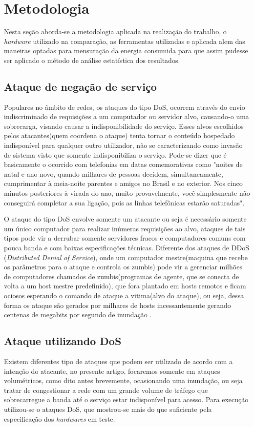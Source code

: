\documentclass[12pt]{article}
\begin{document}
\section{Metodologia} \label{sec:metodologia}
  Nesta seção aborda-se a metodologia aplicada na realização do trabalho, o \textit{hardware} utilizado na comparação, as ferramentas utilizadas e aplicada alem das maneiras optadas para mensuração da energia consumida para que assim pudesse ser aplicado o método de análise estatística dos resultados.


  \subsection{Ataque de negação de serviço} \label{sec:ddos}
    Populares no âmbito de redes, os ataques do tipo DoS, ocorrem através do envio indiscriminado de requisições a um computador ou servidor alvo, causando-o uma sobrecarga, visando causar a indisponibilidade do serviço. Esses alvos escolhidos pelos atacantes(quem coordena o ataque) tenta tornar o conteúdo hospedado indisponível para qualquer outro utilizador, não se caracterizando como invasão de sistema visto que somente indisponibiliza o serviço. Pode-se dizer que é basicamente o ocorrido com telefonias em datas comemorativas como "noites de natal e ano novo, quando milhares de pessoas decidem, simultaneamente, cumprimentar à meia-noite parentes e amigos no Brasil e no exterior. Nos cinco minutos posteriores à virada do ano, muito provavelmente, você simplesmente não conseguirá completar a sua ligação, pois as linhas telefônicas estarão saturadas"\cite{ddOS}.


    O ataque do tipo DoS envolve somente um atacante ou seja é necessário somente um único computador para realizar inúmeras requisições ao alvo, ataques de tais tipos pode vir a derrubar somente servidores fracos e computadores comuns com pouca banda e com baixas especificações técnicas. Diferente dos ataques de DDoS (\textit{Distributed Denial of Service}), onde um computador mestre(maquina que recebe os parâmetros para o ataque e controla os zumbis) pode vir a gerenciar milhões de computadores chamados de zumbis(programas de agente, que se conecta de volta a um host mestre predefinido), que fora plantado em hosts remotos e ficam ociosos esperando o comando de ataque a vitima(alvo do ataque), ou seja, dessa forma os ataque são gerados por milhares de hosts incessantemente gerando centenas de megabits por segundo de inundação \cite{ddOS2}. 
  
  \subsection{Ataque utilizando DoS} \label{sec:ataquedos}
    Existem diferentes tipo de ataques que podem ser utilizado de acordo com a intenção do atacante, no presente artigo, focaremos somente em ataques volumétricos, como dito antes brevemente, ocasionando uma inundação, ou seja tratar de congestionar a rede com um grande volume de tráfego que sobrecarregue a banda até o serviço estar indisponível para acesso. Para execução utilizou-se o ataques DoS, que mostrou-se mais do que suficiente pela especificação dos \textit{hardwares} em teste.
         
\end{document}
